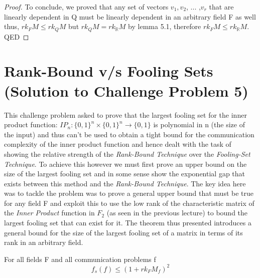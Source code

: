\documentclass[usletter]{article}
\begin{document}
\begin{proof}
\noindent To conclude, we proved that any set of vectors $v_1, v_2$, ... ,$v_r$ that are linearly dependent in Q must be linearly dependent in an arbitrary field F as well thus, $rk_F M \leq rk_Q M$ but $rk_Q M =  rk_{\mathbb{R}} M$ by lemma 5.1, therefore $rk_F M \leq rk_{\mathbb{R}} M$. QED
\end{proof}

\section{Rank-Bound v/s Fooling Sets (Solution to Challenge Problem 5)}
This challenge problem asked to prove that the largest fooling set for the inner product function: $IP_n: \{0, 1\}^n \times \{0, 1\}^n \rightarrow \{0, 1\}$ is polynomial in n (the size of the input) and thus can't be used to obtain a tight bound for the communication complexity of the inner product function and hence dealt with the task of showing the relative strength of the \emph{Rank-Bound Technique} over the \emph {Fooling-Set Technique}. To achieve this however we must first prove an upper bound on the size of the largest fooling set and in some sense show the exponential gap that exists between this method and the \emph{Rank-Bound Technique}. The key idea here was to tackle the problem was to prove a general upper bound that must be true for any field F and exploit this to use the low rank of the characteristic matrix of the \emph{Inner Product} function in $F_2$ (as seen in the previous lecture) to bound the largest fooling set that can exist for it. The theorem thus presented introduces a general bound for the size of the largest fooling set of a matrix in terms of its rank in an arbitrary field. 

\begin {theorem}
For all fields F and all communication problems f 
$$f_s(f) \leq {(1 + rk_F M_f )}^2$$
\end{theorem}
\end{document}
